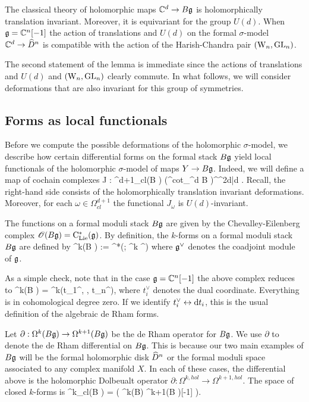 \begin{lem}
The classical theory of holomorphic maps $\mathbb C^d \to B \mathfrak g$ is holomorphically translation invariant. 
Moreover, it is equivariant for the group $U(d)$. 
When $\mathfrak g = \mathbb C^n[-1]$ the action of translations and $U(d)$ on the formal $\sigma$-model $\mathbb C^d \to \widehat{D}^n$ is compatible with the action of the Harish-Chandra pair $({{\rm W}_n}, {\rm GL}_n)$. 
\end{lem}

The second statement of the lemma is immediate since the actions of translations and $U(d)$ and $({{\rm W}_n}, {\rm GL}_n)$ clearly commute.
In what follows, we will consider deformations that are also invariant for this group of symmetries. 

\subsection{Forms as local functionals} \label{sec: forms to local}

Before we compute the possible deformations of the holomorphic $\sigma$-model, we describe how certain differential forms on the formal stack $B \mathfrak g$ yield local functionals of the holomorphic $\sigma$-model of maps $Y \to B \mathfrak g$. 
Indeed, we will define a map of cochain complexes
\ben
J : \Omega^{d+1}_{cl}(B \fg) \to \left(\Def^{\rm cot}_{\CC^d \to B \fg}\right)^{\CC^{2d|d}} .
\een
Recall, the right-hand side consists of the holomorphically translation invariant deformations.
Moreover, for each $\omega \in \Omega^{d+1}_{cl}$ the functional $J_\omega$ is $U(d)$-invariant. 

The functions on a formal moduli stack $B \mathfrak g$ are given by the Chevalley-Eilenberg complex $\mathscr O(B\mathfrak g) = {\rm C}_{{\rm Lie}}^*(\mathfrak g)$.
By definition, the $k$-forms on a formal moduli stack $B\mathfrak g$ are defined by
\ben
\Omega^k(B \fg) := \clie^*(\fg ; \Sym^k \fg^\vee [-k])
\een
where $\mathfrak g^\vee$ denotes the coadjoint module of $\mathfrak g$. 

As a simple check, note that in the case $\mathfrak g = \mathbb C^n [-1]$ the above complex reduces to
\ben
\Omega^k(B \fg) = \CC[t_1,\ldots, t_n] \tensor \wedge^k(t_1^\vee, \cdots, t_n^\vee),
\een
where $t_i^\vee$ denotes the dual coordinate. 
Everything is in cohomological degree zero.
If we identify $t_i^\vee \leftrightarrow {\rm d} t_i$, this is the usual definition of the algebraic de Rham forms. 

Let $\partial : \Omega^{k}(B\mathfrak g) \to \Omega^{k+1}(B\mathfrak g)$ be the de Rham operator for $B\mathfrak g$. 
We use $\partial$ to denote the de Rham differential on $B \mathfrak g$. 
This is because our two main examples of $B \mathfrak g$ will be the formal holomorphic disk $\widehat{D}^n$ or the formal moduli space associated to any complex manifold $X$. 
In each of these cases, the differential above is the holomorphic Dolbeualt operator $\partial : \Omega^{k,hol} \to \Omega^{k+1,hol}$.
The space of closed $k$-forms is
\ben
\hOmega^{k}_{cl}(B \fg) = \left( \Omega^k(B\fg) \xto{\partial} \Omega^{k+1}(B \fg)[-1] \to \cdots \right).
\een

